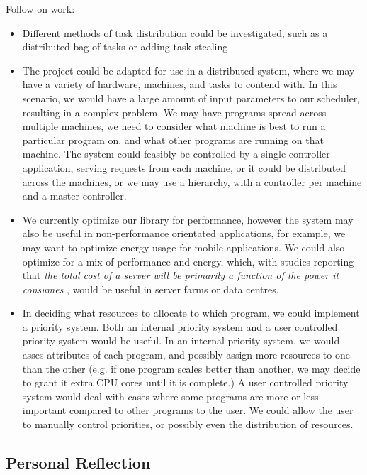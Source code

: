 Follow on work:

\begin{itemize}
	\item Different methods of task distribution could be investigated, such as a distributed bag of tasks or adding task stealing
	\item The project could be adapted for use in a distributed system, where we may have a variety of hardware, machines, and tasks to contend with. In this scenario, we would have a large amount of input parameters to our scheduler, resulting in a complex problem. We may have programs spread across multiple machines, we need to consider what machine is best to run a particular program on, and what other programs are running on that machine. The system could feasibly be controlled by a single controller application, serving requests from each machine, or it could be distributed across the machines, or we may use a hierarchy, with a controller per machine and a master controller. 
	\item We currently optimize our library for performance, however the system may also be useful in non-performance orientated applications, for example, we may want to optimize energy usage for mobile applications. We could also optimize for a mix of performance and energy, which, with studies reporting that \textit{the total cost of a server will be primarily a function of the power it consumes} \cite{datacentres}, would be useful in server farms or data centres.
	\item In deciding what resources to allocate to which program, we could implement a priority system. Both an internal priority system and a user controlled priority system would be useful. In an internal priority system, we would asses attributes of each program, and possibly assign more resources to one than the other (e.g. if one program scales better than another, we may decide to grant it extra CPU cores until it is complete.) A user controlled priority system would deal with cases where some programs are more or less important compared to other programs to the user. We could allow the user to manually control priorities, or possibly even the distribution of resources. 
\end{itemize}



\subsection{Personal Reflection}

